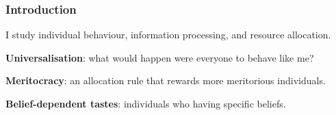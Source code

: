 \documentclass[usenames,dvipsnames,aspectratio=169,11pt,handout]{beamer}
\begin{document}
\begin{frame}
	\maketitle

\end{frame}

\begin{frame}\frametitle{Introduction}

	I study individual behaviour, information processing, and resource allocation. \pause

	\vfill

	\begin{wideenumerate}

		\item \textbf{Universalisation}: what would happen were everyone to behave like me?

		\footnotesize{\citep{algerHomoMoralisPreference2013,laffontMacroeconomicConstraintsEconomic1975,kant1785grundlegung,roemer2019cooperate,vanleeuwenEstimatingSocialPreferences2024}}
		\pause
		\vfill

		\normalsize
		\item \textbf{Meritocracy}: an allocation rule that rewards more meritorious individuals.

		\footnotesize{\citep{cappelenFairUnfairIncome2020,fleurbaey2008fairness,kaganGeometryDesert2014,sandelTyrannyMeritWhat2020,senMeritJustice2000}} \pause
		\vfill

		\normalsize
		\item \textbf{Belief-dependent tastes}: individuals who  having specific beliefs.

		\footnotesize{\citep{benabou2016mindful,geanakoplosPsychologicalGamesSequential1989,golmanInformationAvoidance2017,leggPragmatism2024}}
	\end{wideenumerate}


\end{frame}
\end{document}
